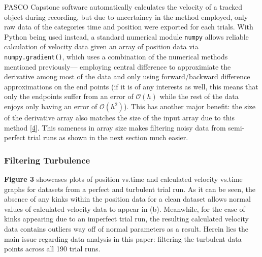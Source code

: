 \documentclass[12pt]{article}
\begin{document}
\begin{multicols}{2}
PASCO Capstone software automatically calculates the velocity of a tracked object during recording,
but due to uncertaincy in the method employed, only raw data of the categories time and position were exported for each trials.
With Python being used instead, a standard numerical module \texttt{numpy} allows reliable calculation of velocity data given an array of position data via \texttt{numpy.gradient()}, which uses a combination of the numerical methods mentioned previously---
employing central difference to approximiate the derivative among most of the data and only using forward/backward difference approximations on the end points
(if it is of any interests as well, this means that only the endpoints suffer from an error of $\mathcal{O}(h)$ while the rest of the data enjoys only having an error of $\mathcal{O}(h^2)$).
This has another major benefit: the size of the derivative array also matches the size of the input array due to this method [\hyperref[sec:4]{4}].
This sameness in array size makes filtering noisy data from semi-perfect trial runs as shown in the next section much easier.

\subsubsection{Filtering Turbulence}
\textbf{Figure 3} showcases plots of position vs.\;time and calculated velocity vs.\;time graphs for datasets from a perfect and turbulent trial run.
As it can be seen, the absence of any kinks within the position data for a clean dataset allows normal values of calculated velocity data to appear in (b).
Meanwhile, for the case of kinks appearing due to an imperfect trial run, the resulting calculated velocity data contains outliers way off of normal parameters as a result.
Herein lies the main issue regarding data analysis in this paper: filtering the turbulent data points across all 190 trial runs.


\end{multicols}
\end{document}

